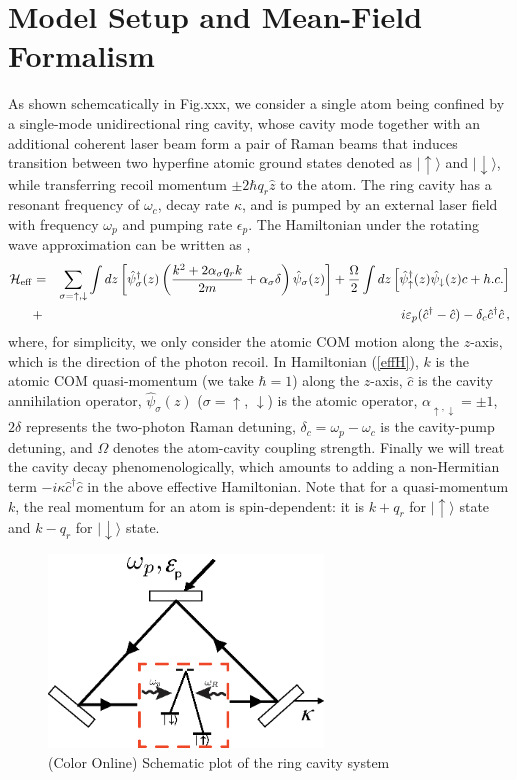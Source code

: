 \documentclass[atoms,article,submit,moreauthors,pdftex,12pt,a4paper]{mdpi}
\def\ba{\begin{eqnarray}}
\def\ea{\end{eqnarray}}
\begin{document}
\section{Model Setup and Mean-Field Formalism} \label{meanfield}
As shown schemcatically in Fig.xxx, we consider a single atom being confined by a single-mode unidirectional ring cavity, whose cavity mode together with an additional coherent laser beam form a pair of Raman beams that induces transition between two hyperfine atomic ground states denoted as $|\uparrow\rangle$ and $|\downarrow\rangle$, while transferring recoil momentum $\pm 2\hbar q_r\hat{z}$ to the atom. The ring cavity has a resonant frequency of $\omega_c$, decay rate $\kappa$, and is pumped by an external laser field with frequency $\omega_p$ and pumping rate $\epsilon_p$. 
The Hamiltonian under the rotating wave approximation can be written as \cite{cavitySOC}, 
\ba
 \mathcal{H}_{\rm eff}& = & \sum_{\sigma=\uparrow,\downarrow} \int d{z}\left[ \hat{\psi}^\dagger_\sigma({z})\left(\frac{ { k}^2+ 2\alpha_\sigma q_r {k}}{2m}+\alpha_\sigma \delta\right)\hat{\psi}_\sigma(z)\right]+  \frac{\Omega}{2}\int d{z}\left[\hat{\psi}_{\uparrow}^{\dagger}({z})\hat{\psi}_{\downarrow}({z})c+ h.c. \right]\nonumber \\
 & + & i\varepsilon_{p}(\hat{c}^{\dagger}-\hat{c})-\delta_c \hat{c}^{\dagger}\hat{c} \,, \label{effH}
 \ea
where, for simplicity, we only consider the atomic COM motion along the $z$-axis, which is the direction of the photon recoil. In Hamiltonian (\ref{effH}), $k$ is the atomic COM quasi-momentum (we take $\hbar =1$) along the $z$-axis, $\hat{c}$ is the cavity annihilation operator, $\hat{\psi}_\sigma(z)$ ($\sigma = \uparrow$, $\downarrow$) is the atomic operator, $\alpha_{\uparrow, \downarrow}=\pm 1$, $2\delta$ represents the two-photon Raman detuning, $\delta_c=\omega_p-\omega_c$ is the cavity-pump detuning, and $\Omega$ denotes the atom-cavity coupling strength. Finally we will treat the cavity decay phenomenologically, which amounts to adding a non-Hermitian term $-i\kappa \hat{c}^{\dagger}\hat{c}$ in the above effective Hamiltonian. Note that for a quasi-momentum $k$, the real momentum for an atom is spin-dependent: it is $k+q_r$ for $|\uparrow \rangle$ state and $k-q_r$ for $|\downarrow \rangle$ state.

\begin{figure}[htp]
\includegraphics[width=0.65\textwidth]{schematic}\caption{(Color Online) Schematic plot of the ring cavity system}\label{schematic}
\end{figure}
\end{document}

